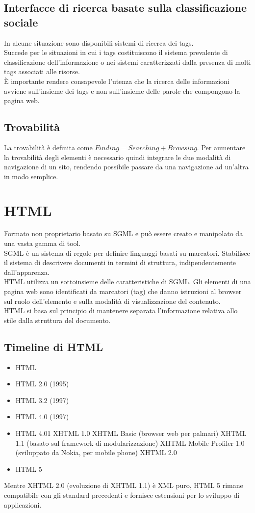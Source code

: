 \documentclass{article}
\begin{document}
\subsection{Interfacce di ricerca basate sulla classificazione sociale}
In alcune situazione sono disponibili sistemi di ricerca dei tags.\\
Succede per le situazioni in cui i tags costituiscono il sistema prevalente di classificazione dell'informazione o nei sistemi caratterizzati dalla presenza di molti tags associati alle risorse.\\
È importante rendere consapevole l'utenza che la ricerca delle informazioni avviene sull'insieme dei tags e non sull'insieme delle parole che compongono la pagina web.\\
\subsection{Trovabilità}
La trovabilità è definita come $ Finding = Searching + Browsing$. Per aumentare la trovabilità degli elementi è necessario quindi integrare le due modalità di navigazione di un sito, rendendo possibile passare da una navigazione ad un'altra in modo semplice.
\section{HTML}
Formato non proprietario basato su SGML e può essere creato e manipolato da una vasta gamma di tool.\\
SGML è un sistema di regole per definire linguaggi basati su marcatori. Stabilisce il sistema di descrivere documenti in termini di struttura, indipendentemente dall'apparenza.\\
HTML utilizza un sottoinsieme delle caratteristiche di SGML. Gli elementi di una pagina web sono identificati da marcatori (tag) che danno istruzioni al browser sul ruolo dell'elemento e sulla modalità di visualizzazione del contenuto.\\ 
HTML si basa sul principio di mantenere separata l'informazione relativa allo stile dalla struttura del documento.
\subsection{Timeline di HTML}
\begin{itemize}
	\item HTML
	\item HTML 2.0 (1995)
	\item HTML 3.2 (1997)
	\item HTML 4.0 (1997)
	\item HTML 4.01
	\subitem XHTML 1.0
	\subitem XHTML Basic (browser web per palmari)
	\subitem XHTML 1.1 (basato sul framework di modularizzazione)
	\subitem XHTML Mobile Profiler 1.0 (sviluppato da Nokia, per mobile phone)
	\subitem XHTML 2.0 
	\item HTML 5
\end{itemize}
Mentre XHTML 2.0 (evoluzione di XHTML 1.1) è XML puro, HTML 5 rimane compatibile con gli standard precedenti e fornisce estensioni per lo sviluppo di applicazioni. 
\end{document}
